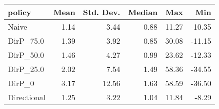 \begin{tabular}{lrrrrr}
\toprule
     policy &  Mean &  Std. Dev. &  Median &   Max &    Min \\
\midrule
      Naive &  1.14 &       3.44 &    0.88 & 11.27 & -10.35 \\
  DirP\_75.0 &  1.39 &       3.92 &    0.85 & 30.08 & -11.15 \\
  DirP\_50.0 &  1.46 &       4.27 &    0.99 & 23.62 & -12.33 \\
  DirP\_25.0 &  2.02 &       7.54 &    1.49 & 58.36 & -34.55 \\
     DirP\_0 &  3.17 &      12.56 &    1.63 & 58.59 & -36.50 \\
Directional &  1.25 &       3.22 &    1.04 & 11.84 &  -8.29 \\
\bottomrule
\end{tabular}
